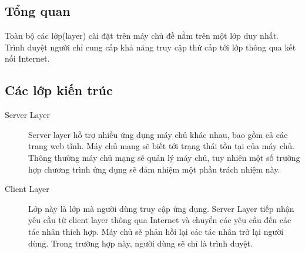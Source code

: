 \documentclass[./../main_file.tex]{subfiles}
\begin{document}
	\subsection{Tổng quan}
	Toàn bộ các lớp(layer) cài đặt trên máy chủ đề nằm trên một lớp duy nhất. Trình duyệt người chỉ cung cấp khả năng truy cập thứ cấp tới lớp thông qua kết nối Internet.
	\subsection{Các lớp kiến trúc}
	
	\begin{description}
		\item[Server Layer] Server layer hỗ trợ nhiều ứng dụng máy chủ khác nhau, bao gồm cả các trang web tĩnh. Máy chủ mạng sẽ biết tới trạng thái tồn tại của máy chủ. Thông thường máy chủ mạng sẽ quản lý máy chủ, tuy nhiên một số trường hợp chương trình ứng dụng sẽ đảm nhiệm một phần trách nhiệm này.
		
		\item[Client Layer] Lớp này là lớp mà người dùng truy cập ứng dụng. Server Layer tiếp nhận yêu cầu từ client layer thông qua Internet và chuyển các yêu cầu đến các tác nhân thích hợp. Máy chủ sẽ phản hồi lại các tác nhân trở lại  người dùng. Trong trường hợp này, người dùng sẽ chỉ là trình duyệt. 
		
	\end{description}
	
\end{document}

